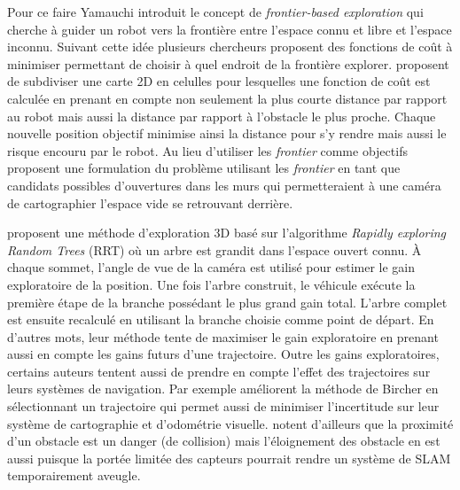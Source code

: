 Pour ce faire Yamauchi introduit le concept de \textit{frontier-based exploration} qui cherche à guider un robot vers la frontière entre l'espace connu et libre et l'espace inconnu. Suivant cette idée plusieurs chercheurs proposent des fonctions de coût à minimiser permettant de choisir à quel endroit de la frontière explorer. \citep{Wirth2007} proposent de subdiviser une carte 2D en celulles pour lesquelles une fonction de coût est calculée en prenant en compte non seulement la plus courte distance par rapport au robot mais aussi la distance par rapport à l'obstacle le plus proche. Chaque nouvelle position objectif minimise ainsi la distance pour s'y rendre mais aussi le risque encouru par le robot. Au lieu d'utiliser les \textit{frontier} comme objectifs \citep{Dornhege2011} proposent une formulation du problème utilisant les \textit{frontier} en tant que candidats possibles d'ouvertures dans les murs qui permetteraient à une caméra de cartographier l'espace vide se retrouvant derrière.

\citep{Bircher2016} proposent une méthode d'exploration 3D basé sur l'algorithme \textit{Rapidly exploring Random Trees} (RRT) où un arbre est grandit dans l'espace ouvert connu. À chaque sommet, l'angle de vue de la caméra est utilisé pour estimer le gain exploratoire de la position. Une fois l'arbre construit, le véhicule exécute la première étape de la branche possédant le plus grand gain total. L'arbre complet est ensuite recalculé en utilisant la branche choisie comme point de départ. En d'autres mots, leur méthode tente de maximiser le gain exploratoire en prenant aussi en compte les gains futurs d'une trajectoire. Outre les gains exploratoires, certains auteurs tentent aussi de prendre en compte l'effet des trajectoires sur leurs systèmes de navigation. Par exemple \citep{Papachristos2017} améliorent la méthode de Bircher en sélectionnant un trajectoire qui permet aussi de minimiser l'incertitude sur leur système de cartographie et d'odométrie visuelle. \citep{Wirth2007} notent d'ailleurs que la proximité d'un obstacle est un danger (de collision) mais l'éloignement des obstacle en est aussi puisque la portée limitée des capteurs pourrait rendre un système de SLAM temporairement aveugle.

